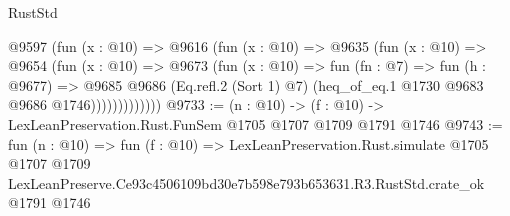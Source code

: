 \begin{lexlean}{RustStd}
\begin{coremodule}
                @9597
                  (fun (x : @10) =>
                  @9616
                    (fun (x : @10) =>
                    @9635
                      (fun (x : @10) =>
                      @9654
                        (fun (x : @10) =>
                        @9673
                          (fun (x : @10) =>
                          fun (fn : @7) =>
                          fun (h : @9677) =>
                          @9685
                            @9686
                            (Eq.refl.{2} (Sort 1) @7)
                            (heq_of_eq.{1} @1730 @9683 @9686 @1746)))))))))))))
@9733 := (n : @10) -> (f : @10) -> LexLeanPreservation.Rust.FunSem @1705 @1707 @1709 @1791 @1746
@9743 := fun (n : @10) =>
  fun (f : @10) =>
  LexLeanPreservation.Rust.simulate
    @1705
    @1707
    @1709
    LexLeanPreserve.Ce93c4506109bd30e7b598e793b653631.R3.RustStd.crate_ok
    @1791
    @1746
\end{coremodule}
\end{lexlean}
